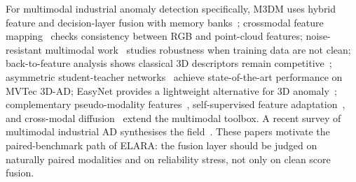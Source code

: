 \documentclass[10pt,conference]{IEEEtran}
\newcommand{\system}{ELARA}
\begin{document}
For multimodal industrial anomaly detection specifically, M3DM uses hybrid
feature and decision-layer fusion with memory
banks~\cite{wang2023m3dm}; crossmodal feature
mapping~\cite{costanzino2023crossmodal} checks consistency between RGB and
point-cloud features; noise-resistant multimodal
work~\cite{wang2024m3dmnr} studies robustness when training data are not
clean; back-to-feature analysis shows classical 3D descriptors remain
competitive~\cite{horwitz2023btf}; asymmetric student-teacher
networks~\cite{rudolph2023ast} achieve state-of-the-art performance on
MVTec 3D-AD; EasyNet provides a lightweight alternative for 3D
anomaly~\cite{chen2023easynet}; complementary pseudo-modality
features~\cite{cao2023rgbpc}, self-supervised feature
adaptation~\cite{tu2024self}, and cross-modal diffusion~\cite{li2023rgbd}
extend the multimodal toolbox. A recent survey of multimodal industrial AD
synthesises the field~\cite{wang2024multimodal}. These papers motivate the
paired-benchmark path of \system{}: the fusion layer should be judged on
naturally paired modalities and on reliability stress, not only on clean
score fusion.
\end{document}
